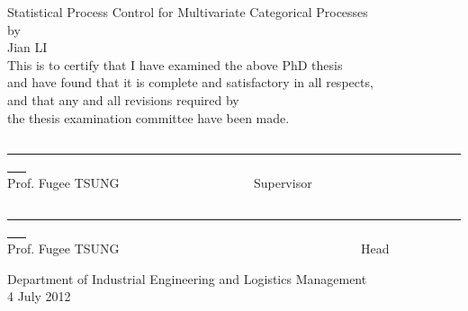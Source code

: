 \newpage
\begin{center}
{\Large Statistical Process Control for Multivariate Categorical Processes}\\
\vspace{23mm}
by\\
\vspace{3mm}
Jian LI\\
\vspace{5mm}
This is to certify that I have examined the above PhD thesis\\
and have found that it is complete and satisfactory in all respects,\\
and that any and all revisions required by\\
the thesis examination committee have been made.
\end{center}

\vspace{20mm}

\begin{center}
\underline{~~~~~~~~~~~~~~~~~~~~~~~~~~~~~~~~~~~~~~~~~~~~~~~~~~~~~~~~~~~~~~~~~~~~~~~~~~~ }\\
Prof. Fugee TSUNG ~~~~~~~~~~~~~~~~~~~~ Supervisor
\end{center}

\vspace{20mm}

\begin{center}
\underline{~~~~~~~~~~~~~~~~~~~~~~~~~~~~~~~~~~~~~~~~~~~~~~~~~~~~~~~~~~~~~~~~~~~~~~~~~~~ }\\
Prof. Fugee TSUNG ~~~~~~~~~~~~~~~~~~~~~~~~~~~~~~~~~~~~~ Head
\end{center}
\vspace{15mm}
\begin{center}
Department of Industrial Engineering and Logistics Management\\
\vspace{5mm} 4 July 2012
\end{center}
